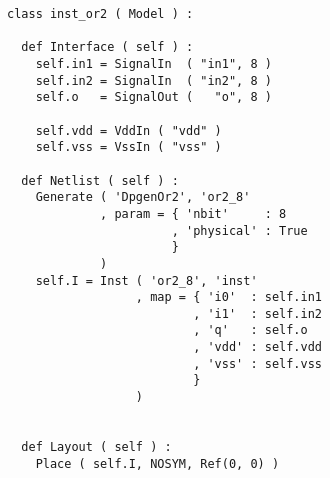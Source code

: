 \begin{itemize}
\begin{verbatim}
class inst_or2 ( Model ) :

  def Interface ( self ) :
    self.in1 = SignalIn  ( "in1", 8 )
    self.in2 = SignalIn  ( "in2", 8 )
    self.o   = SignalOut (   "o", 8 )

    self.vdd = VddIn ( "vdd" )
    self.vss = VssIn ( "vss" )
    
  def Netlist ( self ) :
    Generate ( 'DpgenOr2', 'or2_8'
             , param = { 'nbit'     : 8
                       , 'physical' : True
                       }
             )
    self.I = Inst ( 'or2_8', 'inst'
                  , map = { 'i0'  : self.in1
                          , 'i1'  : self.in2
                          , 'q'   : self.o
                          , 'vdd' : self.vdd
                          , 'vss' : self.vss
                          }
                  )
      
    
  def Layout ( self ) :
    Place ( self.I, NOSYM, Ref(0, 0) )
\end{verbatim}
\end{itemize}
